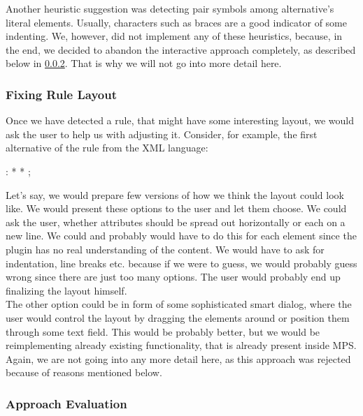 Another heuristic suggestion was detecting pair symbols among alternative's literal elements.
Usually, characters such as braces are a good indicator of some indenting.
We, however, did not implement any of these heuristics, because, in the end, we decided to abandon the interactive approach completely, as described below in \ref{chap:interactive_approach_evaluation}.
That is why we will not go into more detail here.

\subsubsection{Fixing Rule Layout}

Once we have detected a rule, that might have some interesting layout, we would ask the user to help us with adjusting it.
Consider, for example, the first alternative of the  rule from the XML language:

\begin{antlr}
	  :   \literal{<}  * \literal{>} * \literal{</}  \literal{>} ;
\end{antlr}

Let's say, we would prepare few versions of how we think the layout could look like.
We would present these options to the user and let them choose.
We could ask the user, whether attributes should be spread out horizontally or each on a new line.
We could and probably would have to do this for each element since the plugin has no real understanding of the content.
We would have to ask for indentation, line breaks etc. because if we were to guess, we would probably guess wrong since there are just too many options.
The user would probably end up finalizing the layout himself.
\\

The other option could be in form of some sophisticated smart dialog, where the user would control the layout by dragging the elements around or position them through some text field.
This would be probably better, but we would be reimplementing already existing functionality, that is already present inside MPS. 
Again, we are not going into any more detail here, as this approach was rejected because of reasons mentioned below.

\subsubsection{Approach Evaluation}
\label{chap:interactive_approach_evaluation}

